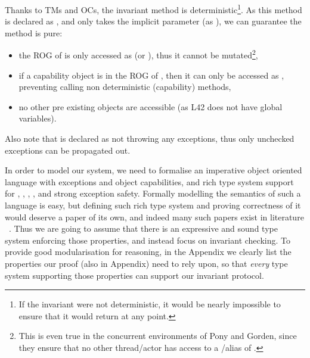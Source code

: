 Thanks to TMs and OCs, the invariant method is deterministic\footnote{If the invariant were not deterministic, it would be nearly impossible to ensure that it would return \Q@true@ at any point.}.
As this method is declared as \Q@read@, and only takes the implicit parameter \Q@this@ (as \Q@read@), we can guarantee the method is pure:
\begin{itemize}
\item the ROG of \Q@this@ is only accessed as \Q@read@ (or \Q@imm@), thus it cannot be mutated\footnote{This is even true in the concurrent environments of Pony and Gorden, since they ensure that no other thread/actor has access to a \Q@mut@/\Q@capsule@ alias of \Q@this@.},
\item if a capability object is in the ROG of \Q@this@, then it can only be accessed as \Q@read@, preventing calling non deterministic (capability) methods,
\item no other pre existing objects are accessible (as L42 does not have global variables).
\end{itemize}

\noindent Also note that \Q@invariant@ is declared as not throwing any exceptions,
	thus only unchecked exceptions can be propagated out.



In order to model our system, we need to formalise an imperative object oriented language
with exceptions and object capabilities,  and rich type system
support for \Q@mut@, \Q@imm@, \Q@read@, \Q@capsule@, and strong exception safety.
Formally modelling the semantics of such a language is easy, but 
defining such rich type system and proving correctness of it would deserve a paper
of its own, and indeed many such papers exist in literature%
~\cite{ServettoEtAl13a,ServettoZucca15,GordonEtAl12,clebsch2015deny,JOT:issue_2011_01/article1}.
Thus we are going to assume that there is an expressive and sound type system enforcing
those properties, and instead focus on invariant checking.
To provide good modularisation for reasoning, in the Appendix
we clearly list the properties our proof (also in Appendix) need to rely upon, so that \emph{every} type
system supporting those properties can support our invariant protocol.

